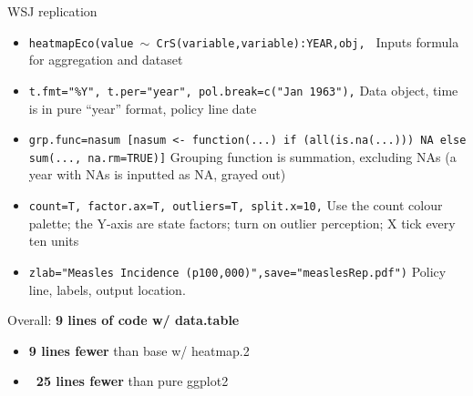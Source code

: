 \begin{frame}{WSJ replication}
        \begin{itemize}
                \footnotesize
        \item<2-> \texttt{heatmapEco(value $\sim$ CrS(variable,variable):YEAR,obj, } \newline
                        Inputs formula for aggregation and dataset
        \item<2-> \texttt{t.fmt="\%Y", t.per="year", pol.break=c("Jan 1963"),} \newline
                         Data object, time is in pure ``year'' format, policy line date
                 \item<3-> \texttt{grp.func=nasum [nasum <- function(...) \newline
                  if (all(is.na(...))) NA else sum(..., na.rm=TRUE)]} \newline
                        Grouping function is summation, excluding NAs (a year with NAs is inputted as NA, grayed out)
                \item<4-> \texttt{count=T, factor.ax=T, outliers=T, split.x=10,} \newline
                      Use the count colour palette; the Y-axis are state factors; turn on outlier perception; X tick every ten units
              \item<5-> \texttt{zlab="Measles Incidence (p100,000)",save="measlesRep.pdf")} \newline
                      Policy line, labels, output location.
      \end{itemize}

      \normalsize
{} {Overall: \textbf{9 lines of code w/ data.table}
\begin{itemize}
        \item \textbf{9 lines fewer} than base w/ heatmap.2
        \item \textbf{~25 lines fewer} than pure ggplot2
\end{itemize}}
\end{frame}

